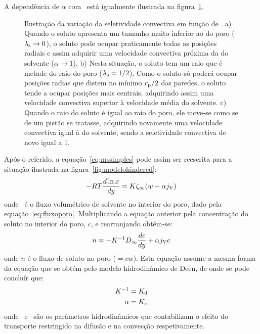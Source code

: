 A dependência de $\alpha$ com \lambdas\ está igualmente ilustrada na figura~\ref{fig:KceAlpha}.
\begin{figure}[!t]
	\centering
	
	\caption[Variação da seletividade convectiva em função de \lambdas]{Ilustração da variação da seletividade convectiva em função de \lambdas. a) Quando o soluto apresenta um 
tamanho muito inferior ao do poro ($\lambda_{\mathrm{s}}\rightarrow 0$), o soluto pode ocupar praticamente todas as posições radiais e assim adquirir uma velocidade convectiva próxima da do solvente ($\alpha\rightarrow 1$). b) Nesta situação, o soluto tem um raio que é metade do raio do poro ($\lambda_{\mathrm{s}}=1/2$). Como o soluto só poderá ocupar posições radias que distem no mínimo $r_{\mathrm{p}}/2$ das paredes, o soluto tende a ocupar posições mais centrais, adquirindo assim uma velocidade convectiva superior à velocidade média do solvente. c) Quando o raio do soluto é igual ao raio do poro, ele move-se como se de um pistão se tratasse, adquirindo novamente uma velocidade convectiva igual à do solvente, sendo a seletividade convectiva de novo igual a 1.}
	\label{fig:KceAlpha}
\end{figure} 
Após o referido, a equação~\ref{eq:mssimples} pode assim ser reescrita para a situação ilustrada na figura~\ref{fig:modelohindered}:
\begin{equation}
   	\label{eq:mshindered}
   	-R T\frac{d\ln x}{dy}=K\zeta_\infty(w-\alpha j_{\mathrm{V}})
   \end{equation}   
onde \fluxoporo\ é o fluxo volumétrico de solvente no interior do poro, dado pela equação~\ref{eq:fluxoporo}. 
Multiplicando a equação anterior pela concentração do soluto no interior do poro, $c$, e rearranjando obtém-se:
\begin{equation}
	\label{eq:mshin2}
	n=-K^{-1}D_{\mathit{\infty}}\frac{dc}{dy}+\alpha j_{\mathrm{V}} c
\end{equation}
onde $n$ é o fluxo de soluto no poro ($=cw$). 
Esta equação assume a mesma forma da equação que se obtém pelo modelo hidrodinâmico de Deen, de onde se pode concluír que:
\begin{equation}
\begin{split}
	\label{eq:kdkkcalfa}
	K^{-1} & =  K_{\mathrm{d}} \\
	\alpha  & =  K_{\mathrm{c}}
\end{split}
\end{equation}
onde \kapade\ e \kapace\ são os parâmetros hidrodinâmicos que contabilizam o efeito do transporte restringido na difusão e na convecção respetivamente. 
